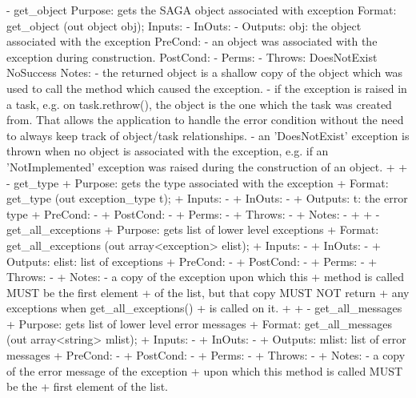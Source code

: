 \begin{myspec}
 
    - get_object
      Purpose:  gets the SAGA object associated with exception
      Format:   get_object     (out object obj);
      Inputs:   -
      InOuts:   -
      Outputs:  obj:            the object associated with the
                                exception
      PreCond:  - an object was associated with the exception
                  during construction.
      PostCond: -
      Perms:    -
      Throws:   DoesNotExist
                NoSuccess
      Notes:    - the returned object is a shallow copy of the 
                  object which was used to call the method which 
                  caused the exception.
                - if the exception is raised in a task, e.g. on
                  task.rethrow(), the object is the one which the
                  task was created from.  That allows the
                  application to handle the error condition 
                  without the need to always keep track of 
                  object/task relationships.
                - an 'DoesNotExist' exception is thrown when no
                  object is associated with the exception, e.g. 
                  if an 'NotImplemented' exception was raised 
                  during the construction of an object.
+
+   - get_type
+     Purpose:  gets the type associated with the exception    
+     Format:   get_type       (out exception_type t);
+     Inputs:   -
+     InOuts:   -
+     Outputs:  t:              the error type
+     PreCond:  -
+     PostCond: -
+     Perms:    -
+     Throws:   -
+     Notes:    - 
+
+   - get_all_exceptions
+     Purpose:  gets list of lower level exceptions
+     Format:   get_all_exceptions (out array<exception> elist);
+     Inputs:   -
+     InOuts:   -
+     Outputs:  elist:          list of exceptions
+     PreCond:  -
+     PostCond: -
+     Perms:    -
+     Throws:   -
+     Notes:    - a copy of the exception upon which this 
+                 method is called MUST be the first element 
+                 of the list, but that copy MUST NOT return 
+                 any exceptions when get_all_exceptions()
+                 is called on it.
+
+   - get_all_messages
+     Purpose:  gets list of lower level error messages
+     Format:   get_all_messages    (out array<string> mlist);
+     Inputs:   -
+     InOuts:   -
+     Outputs:  mlist:         list of error messages
+     PreCond:  -
+     PostCond: -
+     Perms:    -
+     Throws:   -
+     Notes:    - a copy of the error message of the exception 
+                 upon which this method is called MUST be the 
+                 first element of the list.
 \end{myspec}
 
